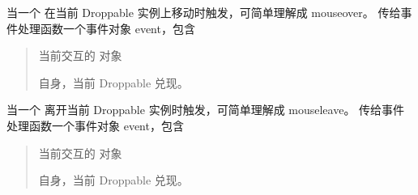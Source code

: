 \documentclass[letterpaper,10pt,english]{sphinxmanual}
\begin{document}
\begin{fulllineitems}
\label{api/component/dd/droppable:DD.Droppable.dropover}
当一个 {\hyperref[api/component/dd/draggable:DD.Draggable]{}} 在当前 Droppable 实例上移动时触发，可简单理解成 mouseover。
传给事件处理函数一个事件对象 event，包含
\begin{quote}


\begin{fulllineitems}
\label{api/component/dd/droppable:DD.Droppable.dropover.event.drag}
当前交互的  对象

\end{fulllineitems}



\begin{fulllineitems}
\label{api/component/dd/droppable:DD.Droppable.dropover.event.drop}
自身，当前 Droppable 兑现。

\end{fulllineitems}

\end{quote}

\end{fulllineitems}



\begin{fulllineitems}
\label{api/component/dd/droppable:DD.Droppable.dropexit}
当一个 {\hyperref[api/component/dd/draggable:DD.Draggable]{}} 离开当前 Droppable 实例时触发，可简单理解成 mouseleave。
传给事件处理函数一个事件对象 event，包含
\begin{quote}


\begin{fulllineitems}
\label{api/component/dd/droppable:DD.Droppable.dropexit.event.drag}
当前交互的  对象

\end{fulllineitems}



\begin{fulllineitems}
\label{api/component/dd/droppable:DD.Droppable.dropexit.event.drop}
自身，当前 Droppable 兑现。

\end{fulllineitems}

\end{quote}

\end{fulllineitems}
\end{document}
